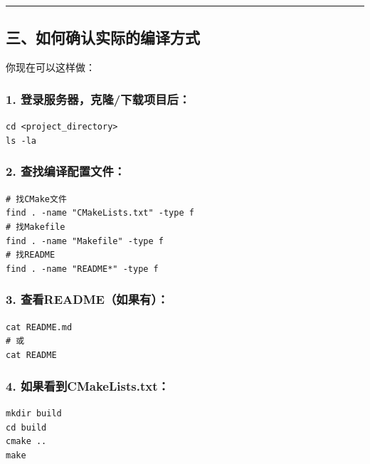 \documentclass[11pt, a4paper]{article}
\begin{document}
\begin{aibox}
\begin{center}\rule{\textwidth}{0.4pt}\end{center}

\subsection*{三、如何确认实际的编译方式}

你现在可以这样做：

\subsubsection*{1. 登录服务器，克隆/下载项目后：}
\begin{tcolorbox}[colback=white,colframe=gray!50!white,boxrule=0.5pt,arc=2pt,left=5pt,right=5pt,top=5pt,bottom=5pt]
\texttt{cd \textless project\_directory\textgreater }\\
\texttt{ls -la}
\end{tcolorbox}

\subsubsection*{2. 查找编译配置文件：}
\begin{tcolorbox}[colback=white,colframe=gray!50!white,boxrule=0.5pt,arc=2pt,left=5pt,right=5pt,top=5pt,bottom=5pt]
\texttt{\# 找CMake文件}\\
\texttt{find . -name "CMakeLists.txt" -type f}\\[0.5em]
\texttt{\# 找Makefile}\\
\texttt{find . -name "Makefile" -type f}\\[0.5em]
\texttt{\# 找README}\\
\texttt{find . -name "README*" -type f}
\end{tcolorbox}

\subsubsection*{3. 查看README（如果有）：}
\begin{tcolorbox}[colback=white,colframe=gray!50!white,boxrule=0.5pt,arc=2pt,left=5pt,right=5pt,top=5pt,bottom=5pt]
\texttt{cat README.md}\\
\texttt{\# 或}\\
\texttt{cat README}
\end{tcolorbox}

\subsubsection*{4. 如果看到CMakeLists.txt：}
\begin{tcolorbox}[colback=white,colframe=gray!50!white,boxrule=0.5pt,arc=2pt,left=5pt,right=5pt,top=5pt,bottom=5pt]
\texttt{mkdir build}\\
\texttt{cd build}\\
\texttt{cmake ..}\\
\texttt{make}
\end{tcolorbox}


\end{aibox}
\end{document}
